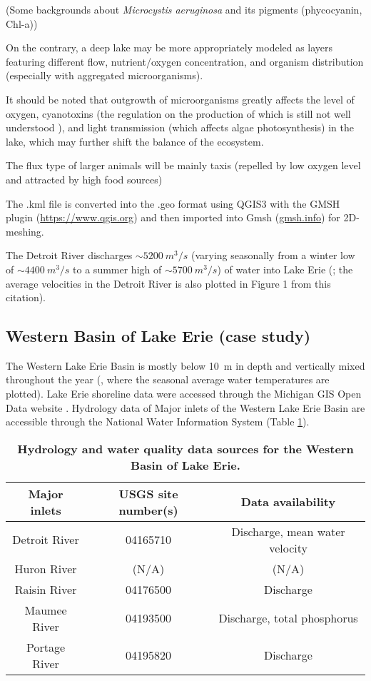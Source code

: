\documentclass{article}
\begin{document}
(Some backgrounds about \textit{Microcystis aeruginosa} and its pigments (phycocyanin, Chl-a))

On the contrary, a deep lake may be more appropriately modeled as layers featuring different flow, nutrient/oxygen concentration, and organism distribution (especially with aggregated microorganisms).

It should be noted that outgrowth of microorganisms greatly affects the level of oxygen, cyanotoxins (the regulation on the production of which is still not well understood \cite{ToxicMaStrainsDominance}), and light transmission (which affects algae photosynthesis) in the lake, which may further shift the balance of the ecosystem.

The flux type of larger animals will be mainly taxis (repelled by low oxygen level and attracted by high food sources)

The .kml file is converted into the .geo format using QGIS3 with the GMSH plugin (\url{https://www.qgis.org}) and then imported into Gmsh (\url{gmsh.info}) for 2D-meshing.

The Detroit River discharges $\sim \SI{5200}{m^3/s}$ (varying seasonally from a winter low of $\sim \SI{4400}{m^3/s}$ to a summer high of $\sim \SI{5700}{m^3/s}$) of water into Lake Erie (\cite{DetroitRiver}; the average velocities in the Detroit River is also plotted in Figure 1 from this citation).


\subsection{Western Basin of Lake Erie (case study)}
The Western Lake Erie Basin is mostly below \SI{10}{m} in depth \cite{LakeErieBathymetry} and vertically mixed throughout the year (\cite{LakeErieSeasonalTemperature}, where the seasonal average water temperatures are plotted). Lake Erie shoreline data were accessed through the Michigan GIS Open Data website \cite{LakeErieShoreline}. Hydrology data of Major inlets of the Western Lake Erie Basin are accessible through the National Water Information System (Table \ref{WesternLakeErieDataSources}).

\begin{table}[ht]
    \renewcommand{\arraystretch}{2}
    \caption{\textbf{Hydrology and water quality data sources for the Western Basin of Lake Erie.}}
    \label{WesternLakeErieDataSources}
    \centering
    \begin{tabular}{c c c}
        \hline
        Major inlets & USGS site number(s) & Data availability \\
        \hline
        Detroit River & 04165710 & Discharge, mean water velocity \\
        Huron River & (N/A) & (N/A) \\
        Raisin River & 04176500 & Discharge \\
        Maumee River & 04193500 & Discharge, total phosphorus \\
        Portage River & 04195820 & Discharge \\
        \hline
    \end{tabular}
\end{table}
\end{document}
